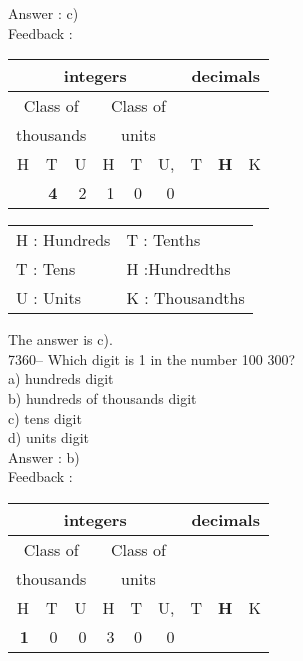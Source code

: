 \documentclass[letterpaper, 12pt]{article}
\begin{document}
Answer : c)\\

Feedback :\\
\begin{center}
\begin{tabular}{|rrr|rrr|rrr|}
\hline
\multicolumn{6}{|c|}{integers} &\multicolumn{3}{|c|}{decimals} \\
\hline
\multicolumn{3}{|c|}{Class of} &\multicolumn{3}{|c|}{Class of} &  \multicolumn{3}{c|}{} \\
\multicolumn{3}{|c|}{thousands} &\multicolumn{3}{|c|}{units} &  \multicolumn{3}{c|}{} \\
\hline
H & T & U &H & T & U, & T\up{th} & \textbf{H\up{th}} & K\up{th} \\
\hline
\hline
  & \textbf{4} & 2 & 1 & 0 & 0 & & & \\
\hline
\end{tabular}
\end{center}

\scriptsize
\begin{center}
\begin{tabular}{ll}
H : Hundreds & T\up{th} : Tenths\\
T : Tens & H\up{th} :Hundredths\\
U : Units & K\up{e} : Thousandths\\
\end{tabular}
\end{center}

\normalsize
The answer is c).\\





7360-- Which digit is 1 in the number 100 300?\\

a) hundreds digit\\
b) hundreds of thousands digit\\
c) tens digit\\
d) units digit\\

Answer : b)\\

Feedback :\\
\begin{center}
\begin{tabular}{|rrr|rrr|rrr|}
\hline
\multicolumn{6}{|c|}{integers} &\multicolumn{3}{|c|}{decimals} \\
\hline
\multicolumn{3}{|c|}{Class of} &\multicolumn{3}{|c|}{Class of} &  \multicolumn{3}{c|}{} \\
\multicolumn{3}{|c|}{thousands} &\multicolumn{3}{|c|}{units} &  \multicolumn{3}{c|}{} \\
\hline
H & T & U &H & T & U, & T\up{th} & \textbf{H\up{th}} & K\up{th} \\
\hline
\hline
 \textbf{1} & 0 & 0 & 3 & 0 & 0 & & & \\
\hline
\end{tabular}
\end{center}
\end{document}
